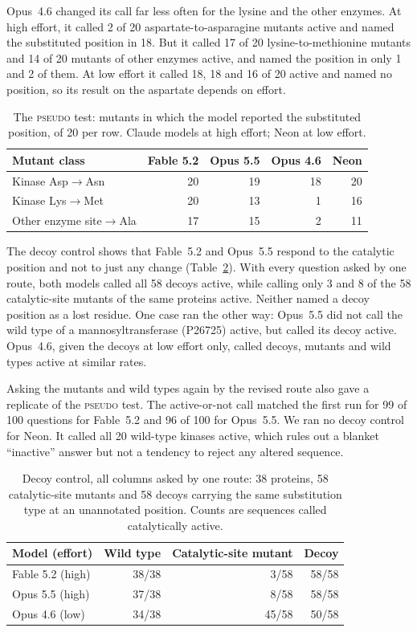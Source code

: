 \documentclass[11pt]{article}
\newcommand{\tpseudo}{\textmd{\textsc{pseudo}}}\newcommand{\tstrfn}{\textmd{\textsc{strfn}}}
\begin{document}
Opus~4.6 changed its call far less often for the lysine and the other enzymes. At high effort, it called 2 of 20 aspartate-to-asparagine
mutants active and named the substituted position in 18. But it called 17 of 20 lysine-to-methionine
mutants and 14 of 20 mutants of other enzymes active, and named the position in only 1 and 2 of them. At
low effort it called 18, 18 and 16 of 20 active and named no position, so its result on the aspartate
depends on effort.

\begin{table}[ht]
\centering\small
\caption{The \tpseudo{} test: mutants in which the model reported the substituted position, of 20 per row. Claude models
at high effort; Neon at low effort.}
\label{tab:positions}
\begin{tabular}{lrrrr}
\toprule
Mutant class & Fable 5.2 & Opus 5.5 & Opus 4.6 & Neon \\
\midrule
Kinase Asp$\to$Asn & 20 & 19 & 18 & 20 \\
Kinase Lys$\to$Met & 20 & 13 & 1 & 16 \\
Other enzyme site$\to$Ala & 17 & 15 & 2 & 11 \\
\bottomrule
\end{tabular}
\end{table}

The decoy control shows that Fable~5.2 and Opus~5.5 respond to the catalytic position and not to just
any change (Table~\ref{tab:decoy}). With every question asked by one route, both models called all 58
decoys active, while calling only 3 and 8 of the 58 catalytic-site mutants of the same proteins active.
Neither named a decoy position as a lost residue. One case ran the other way: Opus~5.5 did not call the
wild type of a mannosyltransferase (P26725) active, but called its decoy active. Opus~4.6, given the
decoys at low effort only, called decoys, mutants and wild types active at similar rates.

Asking the mutants and wild types again by the revised route also gave a replicate of the \tpseudo{} test. The
active-or-not call matched the first run for 99 of 100 questions for Fable~5.2 and 96 of 100 for
Opus~5.5. We ran no decoy control for Neon. It called all 20 wild-type kinases active,
which rules out a blanket ``inactive'' answer but not a tendency to reject any altered sequence.

\begin{table}[ht]
\centering\small
\caption{Decoy control, all columns asked by one route: 38 proteins, 58 catalytic-site mutants and 58
decoys carrying the same substitution type at an unannotated position. Counts are sequences called
catalytically active.}
\label{tab:decoy}
\begin{tabular}{lrrr}
\toprule
Model (effort) & Wild type & Catalytic-site mutant & Decoy \\
\midrule
Fable 5.2 (high) & 38/38 & 3/58 & 58/58 \\
Opus 5.5 (high) & 37/38 & 8/58 & 58/58 \\
Opus 4.6 (low) & 34/38 & 45/58 & 50/58 \\
\bottomrule
\end{tabular}
\end{table}
\end{document}
